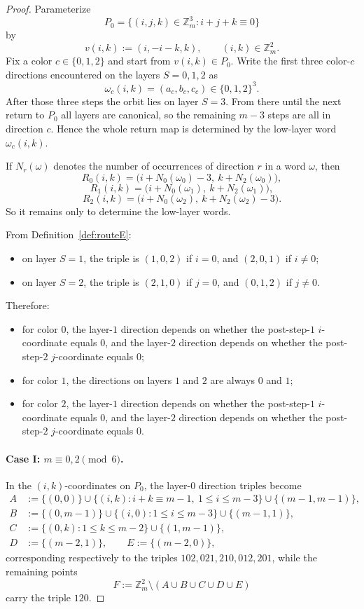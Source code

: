 \documentclass[11pt]{article}
\begin{document}
\begin{proof}
Parameterize
\[
P_0=\{(i,j,k)\in \mathbb Z_m^3:i+j+k\equiv 0\}
\]
by
\[
v(i,k):=(i,-i-k,k),\qquad (i,k)\in \mathbb Z_m^2.
\]
Fix a color $c\in\{0,1,2\}$ and start from $v(i,k)\in P_0$.
Write the first three color-$c$ directions encountered on the layers $S=0,1,2$ as
\[
\omega_c(i,k)=(a_c,b_c,c_c)\in\{0,1,2\}^3.
\]
After those three steps the orbit lies on layer $S=3$.
From there until the next return to $P_0$ all layers are canonical, so the remaining $m-3$ steps are all in direction $c$.
Hence the whole return map is determined by the low-layer word $\omega_c(i,k)$.

If $N_r(\omega)$ denotes the number of occurrences of direction $r$ in a word $\omega$, then
\[
R_0(i,k)=\bigl(i+N_0(\omega_0)-3,\ k+N_2(\omega_0)\bigr),
\]
\[
R_1(i,k)=\bigl(i+N_0(\omega_1),\ k+N_2(\omega_1)\bigr),
\]
\[
R_2(i,k)=\bigl(i+N_0(\omega_2),\ k+N_2(\omega_2)-3\bigr).
\]
So it remains only to determine the low-layer words.

From Definition~\ref{def:routeE}:
\begin{itemize}[leftmargin=2em]
\item on layer $S=1$, the triple is $(1,0,2)$ if $i=0$, and $(2,0,1)$ if $i\ne 0$;
\item on layer $S=2$, the triple is $(2,1,0)$ if $j=0$, and $(0,1,2)$ if $j\ne 0$.
\end{itemize}
Therefore:
\begin{itemize}[leftmargin=2em]
\item for color $0$, the layer-$1$ direction depends on whether the post-step-$1$ $i$-coordinate equals $0$, and the layer-$2$ direction depends on whether the post-step-$2$ $j$-coordinate equals $0$;
\item for color $1$, the directions on layers $1$ and $2$ are always $0$ and $1$;
\item for color $2$, the layer-$1$ direction depends on whether the post-step-$1$ $i$-coordinate equals $0$, and the layer-$2$ direction depends on whether the post-step-$2$ $j$-coordinate equals $0$.
\end{itemize}

\paragraph{Case I: $m\equiv 0,2\pmod 6$.}
In the $(i,k)$-coordinates on $P_0$, the layer-$0$ direction triples become
\begin{align*}
A&:=\{(0,0)\}\cup\{(i,k):i+k\equiv m-1,\ 1\le i\le m-3\}\cup\{(m-1,m-1)\},\\
B&:=\{(0,m-1)\}\cup\{(i,0):1\le i\le m-3\}\cup\{(m-1,1)\},\\
C&:=\{(0,k):1\le k\le m-2\}\cup\{(1,m-1)\},\\
D&:=\{(m-2,1)\},\qquad E:=\{(m-2,0)\},
\end{align*}
corresponding respectively to the triples $102,021,210,012,201$, while the remaining points
\[
F:=\mathbb Z_m^2\setminus (A\cup B\cup C\cup D\cup E)
\]
carry the triple $120$.


\end{proof}
\end{document}

